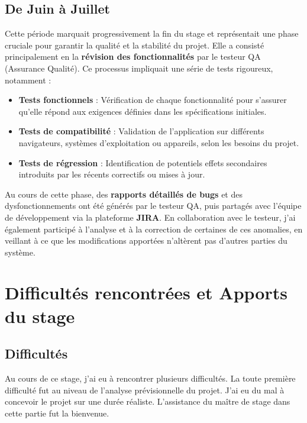 \subsection*{De Juin à Juillet}

Cette période marquait progressivement la fin du stage et représentait une phase cruciale pour garantir la qualité et la stabilité du projet. Elle a consisté principalement en la \textbf{révision des fonctionnalités} par le testeur QA (Assurance Qualité). Ce processus impliquait une série de tests rigoureux, notamment :  

\begin{itemize}
    \item \textbf{Tests fonctionnels} : Vérification de chaque fonctionnalité pour s'assurer qu'elle répond aux exigences définies dans les spécifications initiales.
    \item \textbf{Tests de compatibilité} : Validation de l'application sur différents navigateurs, systèmes d'exploitation ou appareils, selon les besoins du projet.  
    \item \textbf{Tests de régression} : Identification de potentiels effets secondaires introduits par les récents correctifs ou mises à jour.  
\end{itemize}

Au cours de cette phase, des \textbf{rapports détaillés de bugs} et des dysfonctionnements ont été générés par le testeur QA, puis partagés avec l'équipe de développement via la plateforme \textbf{JIRA}. En collaboration avec le testeur, j’ai également participé à l’analyse et à la correction de certaines de ces anomalies, en veillant à ce que les modifications apportées n’altèrent pas d’autres parties du système.

\section{Difficultés rencontrées et Apports du stage}

\subsection*{Difficultés}

Au cours de ce stage, j’ai eu à rencontrer plusieurs difficultés. La toute première difficulté fut au niveau de l'analyse prévisionnelle du projet. J'ai eu du mal à concevoir le projet sur une durée réaliste. L'assistance du maître de stage dans cette partie fut la bienvenue. \\

